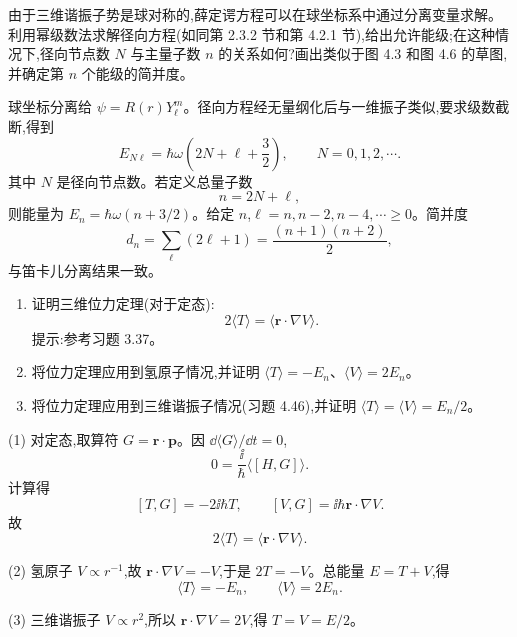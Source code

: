 \begin{question}
由于三维谐振子势是球对称的,薛定谔方程可以在球坐标系中通过分离变量求解。利用幂级数法求解径向方程(如同第 2.3.2 节和第 4.2.1 节),给出允许能级;在这种情况下,径向节点数 $N$ 与主量子数 $n$ 的关系如何?画出类似于图 4.3 和图 4.6 的草图,并确定第 $n$ 个能级的简并度。
\begin{solution}

球坐标分离给 $\psi=R(r)Y_\ell^m$。径向方程经无量纲化后与一维振子类似,要求级数截断,得到
\[
E_{N\ell}=\hbar\omega\left(2N+
\ell+\frac32\right),
\qquad N=0,1,2,\cdots.
\]
其中 $N$ 是径向节点数。若定义总量子数
\[
n=2N+\ell,
\]
则能量为 $E_n=\hbar\omega(n+3/2)$。给定 $n$,$\ell=n,n-2,n-4,\cdots\ge0$。简并度
\[
d_n=\sum_\ell(2\ell+1)=\frac{(n+1)(n+2)}{2},
\]
与笛卡儿分离结果一致。

\end{solution}
\end{question}

\begin{question}
\begin{enumerate}
\item 证明三维位力定理(对于定态):
\[
2\langle T\rangle=\langle \mathbf r\cdot\nabla V\rangle.
\]
提示:参考习题 3.37。
\item 将位力定理应用到氢原子情况,并证明 $\langle T\rangle=-E_n$、$\langle V\rangle=2E_n$。
\item 将位力定理应用到三维谐振子情况(习题 4.46),并证明 $\langle T\rangle=\langle V\rangle=E_n/2$。
\end{enumerate}
\begin{solution}

(1) 对定态,取算符 $G=\mathbf r\cdot\mathbf p$。因 $\dd\langle G\rangle/\dd t=0$,
\[
0=\frac{\ii}{\hbar}\langle[H,G]\rangle.
\]
计算得
\[
[T,G]=-2\ii\hbar T,
\qquad [V,G]=\ii\hbar\mathbf r\cdot\nabla V.
\]
故
\[
2\langle T\rangle=\langle\mathbf r\cdot\nabla V\rangle.
\]

(2) 氢原子 $V\propto r^{-1}$,故 $\mathbf r\cdot\nabla V=-V$,于是 $2T=-V$。总能量 $E=T+V$,得
\[
\langle T\rangle=-E_n,
\qquad \langle V\rangle=2E_n.
\]

(3) 三维谐振子 $V\propto r^2$,所以 $\mathbf r\cdot\nabla V=2V$,得 $T=V=E/2$。

\end{solution}
\end{question}


